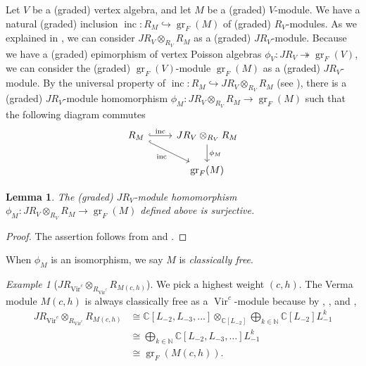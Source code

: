 \documentclass[a4paper, 12pt, reqno]{amsart}
\newtheorem{lemma}[theorem]{Lemma}
\theoremstyle{remark}
\newtheorem{example}[theorem]{Example}
\DeclareMathOperator{\Vir}{Vir}
\DeclareMathOperator{\gr}{gr}
\DeclareMathOperator{\inc}{inc}
\begin{document}
Let $V$ be a (graded) vertex algebra, and let $M$ be a (graded) $V$-module.
We have a natural (graded) inclusion $\inc: R_M \hookrightarrow \gr_F(M)$ of (graded) $R_V$-modules.
As we explained in , we can consider $JR_V \otimes_{R_V} R_M$ as a (graded) $JR_V$-module.
Because we have a (graded) epimorphism of vertex Poisson algebras $\phi_V: JR_V \twoheadrightarrow \gr_F(V)$, we can consider the (graded) $\gr_F(V)$-module $\gr_F(M)$ as a (graded) $JR_V$-module.
By the universal property of $\inc: R_M \hookrightarrow JR_V \otimes_{R_V} R_M$ (see ), there is a (graded) $JR_V$-module homomorphism $\phi_M: JR_V \otimes_{R_V} R_M \to \gr_F(M)$ such that the following diagram commutes
\begin{equation*}
  \begin{tikzcd}
    R_M \arrow[r, "\inc", hook] \arrow[rd, "\inc"', hook] & JR_V \otimes_{R_V} R_M \arrow[d, "\phi_M"] \\
    & \gr_F(M)
  \end{tikzcd}
\end{equation*}

\begin{lemma}
  \label{lmm:28}
  The (graded) $JR_V$-module homomorphism $\phi_M: JR_V \otimes_{R_V} R_M \to \gr_F(M)$ defined above is surjective.
\end{lemma}

\begin{proof}
  The assertion follows from  and .
\end{proof}

When $\phi_M$ is an isomorphism, we say $M$ is \emph{classically free}.

\begin{example}[$JR_{\Vir^c} \otimes_{R_{\Vir^c}} R_{M(c, h)}$]
  \label{exa:22}
  We pick a highest weight $(c, h)$.
  The Verma module $M(c, h)$ is always classically free as a $\Vir^c$-module because by , ,  and ,
  \begin{align*}
    JR_{\Vir^c} \otimes_{R_{\Vir^c}} R_{M(c, h)} &\cong \mathbb{C}[L_{-2}, L_{-3}, \dots] \otimes_{\mathbb{C}[L_{-2}]} \bigoplus_{k \in \mathbb{N}}\mathbb{C}[L_{-2}]L_{-1}^k \\
                                                 &\cong \bigoplus_{k \in \mathbb{N}}\mathbb{C}[L_{-2}, L_{-3}, \dots]L_{-1}^k \\
                                                 &\cong \gr_F(M(c, h)).
  \end{align*}
\end{example}
\end{document}

